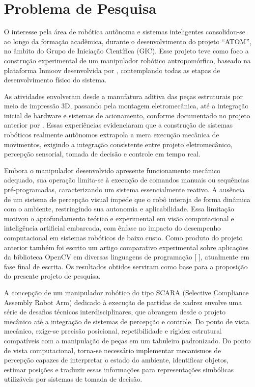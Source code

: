\chapter*{Problema de Pesquisa}

O interesse pela área de robótica autônoma e sistemas inteligentes consolidou-se ao longo da formação acadêmica, durante o desenvolvimento do projeto “ATOM”, no âmbito do Grupo de Iniciação Científica (GIC). Esse projeto teve como foco a construção experimental de um manipulador robótico antropomórfico, baseado na plataforma Inmoov desenvolvida por , contemplando todas as etapas de desenvolvimento físico do sistema.

As atividades envolveram desde a manufatura aditiva das peças estruturais por meio de impressão 3D, passando pela montagem eletromecânica, até a integração inicial de hardware e sistemas de acionamento, conforme documentado no projeto anterior por . Essas experiências evidenciaram que a construção de sistemas robóticos realmente autônomos extrapola a mera execução mecânica de movimentos, exigindo a integração consistente entre projeto eletromecânico, percepção sensorial, tomada de decisão e controle em tempo real.

Embora o manipulador desenvolvido apresente funcionamento mecânico adequado, sua operação limita-se à execução de comandos manuais ou sequências pré-programadas, caracterizando um sistema essencialmente reativo. A ausência de um sistema de percepção visual impede que o robô interaja de forma dinâmica com o ambiente, restringindo sua autonomia e aplicabilidade. Essa limitação motivou o aprofundamento teórico e experimental em visão computacional e inteligência artificial embarcada, com ênfase no impacto do desempenho computacional em sistemas robóticos de baixo custo. Como produto do projeto anterior também foi escrito um artigo comparativo experimental sobre aplicações da biblioteca OpenCV em diversas linguagens de programação [  ], atualmente em fase final de escrita. Os resultados obtidos serviram como base para a proposição do presente projeto de pesquisa.

A concepção de um manipulador robótico do tipo SCARA (Selective Compliance Assembly Robot Arm) dedicado à execução de partidas de xadrez envolve uma série de desafios técnicos interdisciplinares, que abrangem desde o projeto mecânico até a integração de sistemas de percepção e controle. Do ponto de vista mecânico, exige-se precisão posicional, repetibilidade e rigidez estrutural compatíveis com a manipulação de peças em um tabuleiro padronizado. Do ponto de vista computacional, torna-se necessário implementar mecanismos de percepção capazes de interpretar o estado do ambiente, identificar objetos, estimar posições e traduzir essas informações para representações simbólicas utilizáveis por sistemas de tomada de decisão.


